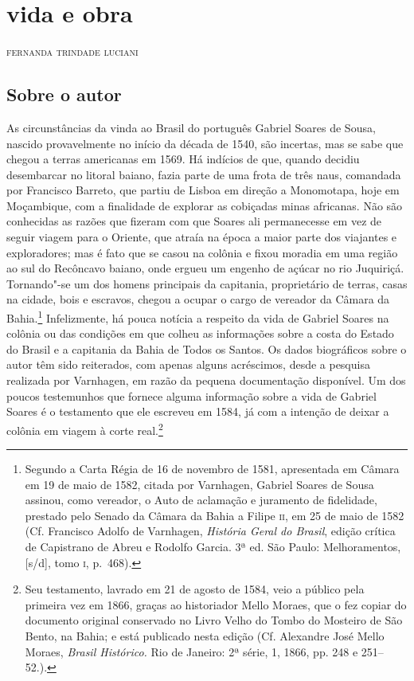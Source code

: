 \chapter[vida e obra, \emph{por Fernanda Trindade Luciani}]{vida e obra}

\begin{flushright}
\textsc{fernanda trindade luciani}
\end{flushright}

\section{Sobre o autor}

 As circunstâncias da vinda ao Brasil do português Gabriel Soares de
Sousa, nascido provavelmente no início da década de 1540, são incertas,
mas se sabe que chegou a terras americanas em 1569. Há indícios de que,
quando decidiu desembarcar no litoral baiano, fazia parte de uma frota
de três naus, comandada por Francisco Barreto, que partiu de Lisboa em
direção a Monomotapa, hoje em Moçambique, com a finalidade de explorar
as cobiçadas minas africanas. Não são conhecidas as razões que fizeram com que Soares ali
permanecesse em vez de seguir viagem para o Oriente, que atraía na
época a maior parte dos viajantes e exploradores; 
mas é fato que se casou na colônia e fixou moradia em uma região ao sul do
Recôncavo baiano, onde ergueu um engenho de açúcar no rio Juquiriçá.
Tornando"-se um dos homens principais da capitania, proprietário de
terras, casas na cidade, bois e escravos, chegou a ocupar o cargo de
vereador da Câmara da Bahia.\footnote{ Segundo a Carta Régia de 16 de
novembro de 1581, apresentada em Câmara em 19 de maio de 1582, citada
por Varnhagen, Gabriel Soares de Sousa assinou, como vereador, o Auto
de aclamação e juramento de fidelidade, prestado pelo Senado da Câmara
da Bahia a Filipe \textsc{ii}, em 25 de maio de 1582 (Cf. Francisco Adolfo de
Varnhagen, \textit{História Geral do Brasil}, edição crítica de Capistrano de 
Abreu e Rodolfo Garcia. 3ª ed. São Paulo: Melhoramentos, [s/d], tomo \textsc{i}, p.~468).}
Infelizmente, há pouca notícia a respeito da vida de Gabriel Soares na
colônia ou das condições em que colheu as informações sobre a costa do
Estado do Brasil e a capitania da Bahia de Todos os Santos. Os dados
biográficos sobre o autor têm sido reiterados, com apenas alguns
acréscimos, desde a pesquisa realizada por Varnhagen, em razão da
pequena documentação disponível. Um dos poucos testemunhos que fornece
alguma informação sobre a vida de Gabriel Soares é o testamento que ele
escreveu em 1584, já com a intenção de deixar a colônia em viagem à corte
real.\footnote{ Seu testamento, lavrado em 21 de agosto de 1584, veio a
público pela primeira vez em 1866, graças ao historiador Mello Moraes,
que o fez copiar do documento original conservado no Livro Velho do
Tombo do Mosteiro de São Bento, na Bahia; e está publicado nesta edição
(Cf. Alexandre José Mello Moraes, \textit{Brasil Histórico.} Rio de
Janeiro: 2ª série, 1, 1866, pp. 248 e 251--52.).}

